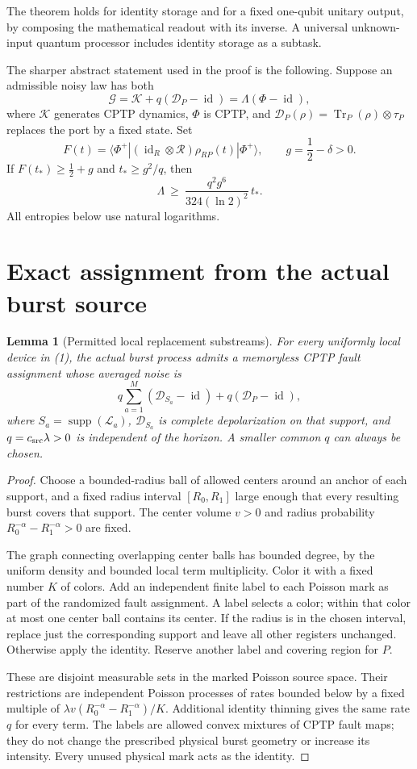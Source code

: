 \documentclass[11pt]{article}
\newtheorem{lemma}[theorem]{Lemma}
\newcommand{\Tr}{\operatorname{Tr}}
\newcommand{\id}{\operatorname{id}}
\newcommand{\supp}{\operatorname{supp}}
\newcommand{\D}{\mathcal D}
\newcommand{\G}{\mathcal G}
\begin{document}
The theorem holds for identity storage and for a fixed one-qubit unitary
output, by composing the mathematical readout with its inverse. A
universal unknown-input quantum processor includes identity storage as
a subtask.

The sharper abstract statement used in the proof is the following.
Suppose an admissible noisy law has both
\[
 \G=\mathcal K+q(\D_P-\id)
       =\Lambda(\Phi-\id),
 \tag{6}
\]
where \(\mathcal K\) generates CPTP dynamics, \(\Phi\) is CPTP, and
\(\D_P(\rho)=\Tr_P(\rho)\otimes\tau_P\) replaces the port by a fixed state.
Set
\[
 F(t)=\langle\Phi^+|(\id_R\otimes\mathcal R)
                         \rho_{RP}(t)|\Phi^+\rangle,\qquad
 g=\frac12-\delta>0.
 \tag{7}
\]
If \(F(t_*)\geq\frac12+g\) and \(t_*\geq g^2/q\), then
\[
 \boxed{\quad
 \Lambda\ \geq\ \frac{q^2g^6}{324(\ln2)^2}\,t_*.
 \quad}
 \tag{8}
\]
All entropies below use natural logarithms.

\section{Exact assignment from the actual burst source}

\begin{lemma}[Permitted local replacement substreams]\label{lem:source}
For every uniformly local device in (1), the actual burst process admits
a memoryless CPTP fault assignment whose averaged noise is
\[
 q\sum_{a=1}^{M}(\D_{S_a}-\id)+q(\D_P-\id),
 \tag{9}
\]
where \(S_a=\supp(\mathcal L_a)\), \(\D_{S_a}\) is complete
depolarization on that support, and \(q=c_{\rm src}\lambda>0\) is
independent of the horizon. A smaller common \(q\) can always be chosen.
\end{lemma}

\begin{proof}
Choose a bounded-radius ball of allowed centers around an anchor of each
support, and a fixed radius interval \([R_0,R_1]\) large enough that
every resulting burst covers that support. The center volume \(v>0\)
and radius probability \(R_0^{-\alpha}-R_1^{-\alpha}>0\) are fixed.

The graph connecting overlapping center balls has bounded degree, by the
uniform density and bounded local term multiplicity. Color it with a
fixed number \(K\) of colors. Add an independent finite label to each
Poisson mark as part of the randomized fault assignment. A label selects
a color; within that color at most one center ball contains its center.
If the radius is in the chosen interval, replace just the corresponding
support and leave all other registers unchanged. Otherwise apply the
identity. Reserve another label and covering region for \(P\).

These are disjoint measurable sets in the marked Poisson source space.
Their restrictions are independent Poisson processes of rates bounded
below by a fixed multiple of
\(\lambda v(R_0^{-\alpha}-R_1^{-\alpha})/K\).
Additional identity thinning gives the same rate \(q\) for every term.
The labels are allowed convex mixtures of CPTP fault maps; they do not
change the prescribed physical burst geometry or increase its intensity.
Every unused physical mark acts as the identity.
\end{proof}
\end{document}
